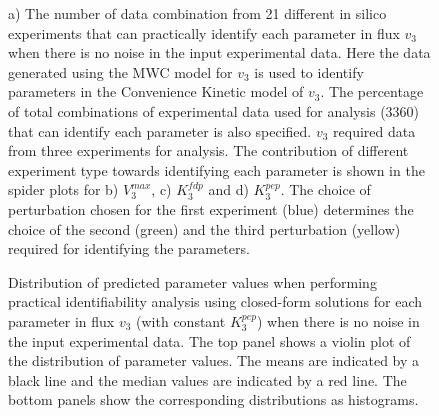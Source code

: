 \documentclass[10pt]{article}
\begin{document}
\begin{figure}[!tbhp]
	\caption{a) The number of data combination from 21 different in silico experiments that can practically identify each parameter in flux $v_3$ when there is no noise in the input experimental data. Here the data generated using the MWC model for $v_3$ is used to identify parameters in the Convenience Kinetic model of $v_3$. The percentage of total combinations of experimental data used for analysis (3360) that can identify each parameter is also specified. $v_3$ required data from three experiments for analysis. The contribution of different experiment type towards identifying each parameter is shown in the spider plots for b) $V_3^{max}$, c) $K_3^{fdp}$ and d) $K_3^{pep}$. The choice of perturbation chosen for the first experiment (blue) determines the choice of the second (green) and the third perturbation (yellow) required for identifying the parameters.}\label{fig:v3_mwc_ck_ident}
\end{figure}

\begin{figure}[!tbhp]
	\caption{Distribution of predicted parameter values when performing practical identifiability analysis using closed-form solutions for each parameter in flux $v_3$ (with constant $K_3^{pep}$) when there is no noise in the input experimental data. The top panel shows a violin plot of the distribution of parameter values. The means are indicated by a black line and the median values are indicated by a red line. The bottom panels show the corresponding distributions as histograms.}\label{fig:v3_var_k3fdp_values}
\end{figure}	
\end{document}
